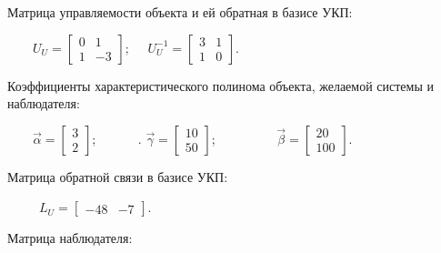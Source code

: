 \documentclass[a4paper]{article}
\begin{document}
{\begin{russian}\sffamily
Матрица управляемости объекта и ей обратная в базисе УКП:
\end{russian}}

{\begin{russian}\sffamily
\ \ \ \  $U_U=\left[\begin{matrix}0&1\\1&-3\end{matrix}\right];$ \ \ 
$U_U^{-1}=\left[\begin{matrix}3&1\\1&0\end{matrix}\right]$.
\end{russian}}


\bigskip


\bigskip


\bigskip


\bigskip


\bigskip


\bigskip

{\begin{russian}\sffamily
Коэффициенты характеристического полинома объекта, желаемой системы и наблюдателя: 
\end{russian}}

{\begin{russian}\sffamily
\ \ \ \  $\vec α=\left[\begin{matrix}3\\2\end{matrix}\right]$; \ \ \ \ \ \ . $\vec
γ=\left[\begin{matrix}10\\50\end{matrix}\right]$; \ \ \ \ \ \ \ \ \  $\vec
β=\left[\begin{matrix}20\\100\end{matrix}\right]$.
\end{russian}}

{\begin{russian}\sffamily
Матрица обратной связи в базисе УКП:
\end{russian}}

{\begin{russian}\sffamily
\ \ \ \ \  $L_U=\left[\begin{matrix}-48&-7\end{matrix}\right]$.
\end{russian}}

{\begin{russian}\sffamily
Матрица наблюдателя:
\end{russian}}
\end{document}
